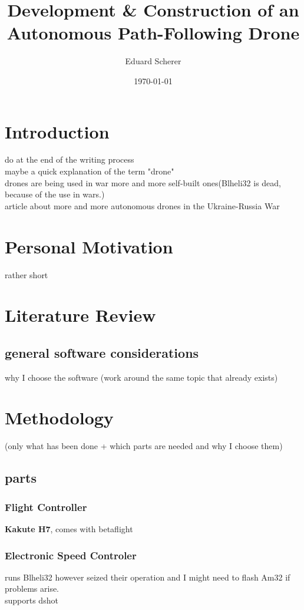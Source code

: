 \documentclass{article}
\author{Eduard Scherer}
\title{Development \& Construction of an Autonomous Path-Following Drone}
\date{\today}
\begin{document}
\maketitle
	\section{Introduction}
	do at the end of the writing process
	\\maybe a quick explanation of the term "drone"
	\\ drones are being used in war more and more self-built ones(Blheli32 is dead, because of the use in wars.)
	\\ article about more and more autonomous drones in the Ukraine-Russia War
	
	\section{Personal Motivation}
	rather short
	\section{Literature Review}
	\subsection{general software considerations}
	why I choose the software
	(work around the same topic that already exists)
	\section{Methodology}
	(only what has been done + which parts are needed and why I choose them)
	\subsection{parts}
	
	\subsubsection[Fc]{Flight Controller}
	\textbf{Kakute H7}, comes with betaflight
	\subsubsection[ESC]{Electronic Speed Controler}
	runs Blheli32 however seized their operation and I might need to flash Am32 if problems arise.
	\\supports dshot 
	
	
	
\end{document}
